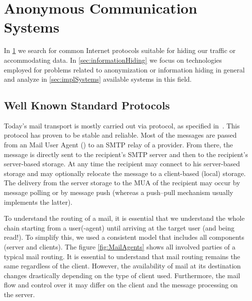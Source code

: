 
\part{Anonymous Communication Systems}\label{sec:systems}
In \cref{sec:standardProtocols} we search for common Internet protocols suitable for hiding our traffic or accommodating data. In \cref{sec:informationHiding} we focus on technologies employed for problems related to anonymization or information hiding in general and analyze in \cref{sec:implSystems} available systems in this field.

\chapter{Well Known Standard Protocols}\label{sec:standardProtocols}
\label{sec:mailTransport}
Today's mail transport is mostly carried out via  protocol, as specified in~\cite{rfc5321}. This protocol has proven to be stable and reliable. Most of the messages are passed from an Mail User Agent () to an SMTP relay of a provider. From there, the message is directly sent to the recipient's SMTP server and then to the recipient's server-based storage. At any time the recipient may connect to his server-based storage and may optionally relocate the message to a client-based (local) storage. The delivery from the server storage to the MUA of the recipient may occur by message polling or by message push (whereas a push--pull mechanism usually implements the latter).

To understand the routing of a mail, it is essential that we understand the whole chain starting from a user(-agent) until arriving at the target user (and being read!). To simplify this, we used a consistent model that includes all components (server and clients). The figure \ref{fig:MailAgents} shows all involved parties of a typical mail routing. It is essential to understand that mail routing remains the same regardless of the client. However, the availability of mail at its destination changes drastically depending on the type of client used. Furthermore, the mail flow and control over it may differ on the client and the message processing on the server.

